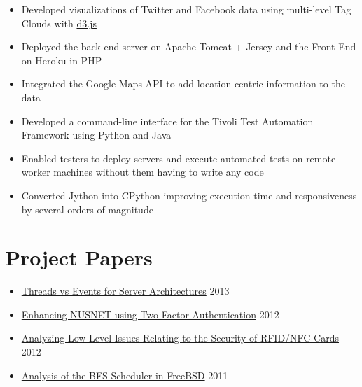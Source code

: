 \documentclass[11pt,a4paper]{moderncv}
\begin{document}
{\begin{itemize}
        \item Developed visualizations of Twitter and Facebook data using multi-level Tag Clouds with \href{http://d3js.org/}{d3.js}
        \item Deployed the back-end server on Apache Tomcat + Jersey and the Front-End on Heroku in PHP
        \item Integrated the Google Maps API to add location centric information to the data
 \end{itemize}}

{\begin{itemize}
        \item Developed a command-line interface for the Tivoli Test Automation Framework using Python and Java
        \item Enabled testers to deploy servers and execute automated tests on remote worker machines without them having to write any code
        \item Converted Jython into CPython improving execution time and responsiveness by several orders of magnitude
 \end{itemize}}
\section{Project Papers}
\begin{itemize}
\item \href{http://vellvisher.github.io/papers_reports/doc/Threads_vs_Events_Server_Architectures.pdf}{Threads vs Events for Server Architectures} \hfill 2013
\item \href{http://vellvisher.github.io/papers_reports/doc/NUS_2FA_GA.pdf}{Enhancing NUSNET using Two-Factor Authentication} \hfill 2012
\item \href{http://vellvisher.github.io/papers_reports/doc/RFID_NFC.pdf}{Analyzing Low Level Issues Relating to the Security of RFID/NFC Cards} \hfill 2012
\item \href{http://vellvisher.github.io/papers_reports/doc/BFS_FreeBSD.pdf}{Analysis of the BFS Scheduler in FreeBSD} \hfill 2011
\end{itemize}
\pagebreak
\end{document}
